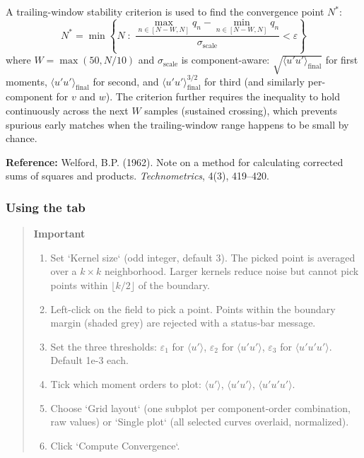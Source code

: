 A trailing-window stability criterion is used to find the convergence point $N^*$:
\[
N^* = \min\left\{ N \;:\; \frac{\max_{n \in [N - W, N]} q_n - \min_{n \in [N - W, N]} q_n}{\sigma_{\mathrm{scale}}} < \varepsilon \right\}
\]
where $W = \max(50, N/10)$ and $\sigma_{\mathrm{scale}}$ is component-aware: $\sqrt{\langle u'u'\rangle_{\mathrm{final}}}$ for first moments, $\langle u'u'\rangle_{\mathrm{final}}$ for second, and $\langle u'u'\rangle_{\mathrm{final}}^{3/2}$ for third (and similarly per-component for $v$ and $w$). The criterion further requires the inequality to hold continuously across the next $W$ samples (sustained crossing), which prevents spurious early matches when the trailing-window range happens to be small by chance.

\noindent\textbf{Reference:} Welford, B.P. (1962). Note on a method for calculating corrected sums of squares and products. \textit{Technometrics}, 4(3), 419--420.

\subsubsection{Using the tab}

\begin{quote}
\textbf{Important}
\begin{enumerate}[leftmargin=1.5em, topsep=2pt]
  \item Set `Kernel size` (odd integer, default 3). The picked point is averaged over a $k \times k$ neighborhood. Larger kernels reduce noise but cannot pick points within $\lfloor k/2 \rfloor$ of the boundary.
  \item Left-click on the field to pick a point. Points within the boundary margin (shaded grey) are rejected with a status-bar message.
  \item Set the three thresholds: $\varepsilon_1$ for $\langle u' \rangle$, $\varepsilon_2$ for $\langle u'u' \rangle$, $\varepsilon_3$ for $\langle u'u'u' \rangle$. Default 1e-3 each.
  \item Tick which moment orders to plot: $\langle u' \rangle$, $\langle u'u' \rangle$, $\langle u'u'u' \rangle$.
  \item Choose `Grid layout` (one subplot per component-order combination, raw values) or `Single plot` (all selected curves overlaid, normalized).
  \item Click `Compute Convergence`.
\end{enumerate}
\end{quote}

